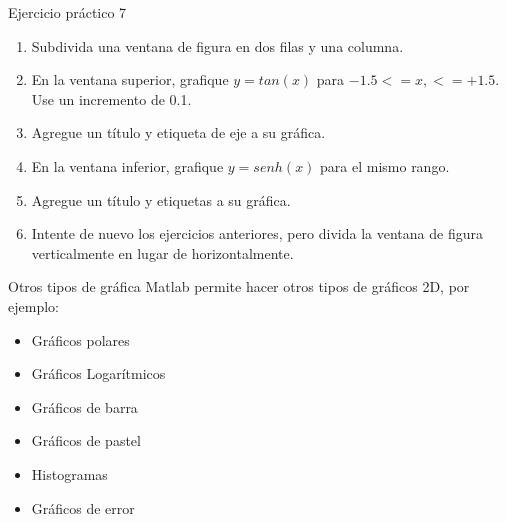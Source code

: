 \documentclass{bredelebeamer}
\begin{document}
\begin{frame}{Ejercicio práctico 7}
\begin{enumerate}
\item Subdivida una ventana de figura en dos filas y una columna.
\item En la ventana superior, grafique $y=tan(x)$ para $-1.5<=x,<= +1.5$. Use un incremento de 0.1.
\item Agregue un título y etiqueta de eje a su gráfica.
\item En la ventana inferior, grafique $y=senh(x)$ para el mismo rango.
\item Agregue un título y etiquetas a su gráfica.
\item Intente de nuevo los ejercicios anteriores, pero divida la ventana de figura verticalmente en lugar de horizontalmente.
\end{enumerate}
\end{frame}

\begin{frame}{Otros tipos de gráfica}
Matlab permite hacer otros tipos de gráficos 2D, por ejemplo:
\begin{itemize}
\item Gráficos polares
\item Gráficos Logarítmicos
\item Gráficos de barra
\item Gráficos de pastel
\item Histogramas
\item Gráficos de error
\end{itemize}
\end{frame}
\end{document}
